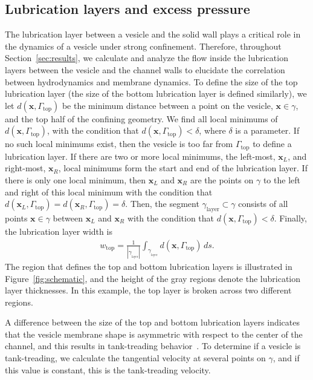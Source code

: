 \documentclass[twoside,twocolumn,9pt]{article}
\newcommand{\xx}{\mathbf{x}}
\begin{document}
\subsection{\label{sec:LL} Lubrication layers and excess pressure}
The lubrication layer between a vesicle and the solid wall plays a
critical role in the dynamics of a vesicle under strong confinement.
Therefore, throughout Section~\ref{sec:results}, we calculate and
analyze the flow inside the lubrication layers between the vesicle and
the channel walls to elucidate the correlation between hydrodynamics and
membrane dynamics. To define the size of the top lubrication layer (the
size of the bottom lubrication layer is defined similarly), we let
$d(\xx,\Gamma_\mathrm{top})$ be the minimum distance between a point on
the vesicle, $\xx \in \gamma$, and the top half of the confining
geometry. We find all local minimums of $d(\xx,\Gamma_\mathrm{top})$,
with the condition that $d(\xx,\Gamma_\mathrm{top}) < \delta$, where
$\delta$ is a parameter. If no such local minimums exist, then the
vesicle is too far from $\Gamma_\mathrm{top}$ to define a lubrication
layer. If there are two or more local minimums, the left-most, $\xx_L$,
and right-most, $\xx_R$, local minimums form the start and end of the
lubrication layer.  If there is only one local minimum, then $\xx_L$ and
$\xx_R$ are the points on $\gamma$ to the left and right of this local
minimum with the condition that $d(\xx_L,\Gamma_\mathrm{top}) =
d(\xx_R,\Gamma_\mathrm{top}) = \delta$. Then, the segment
$\gamma_{\mathrm{layer}} \subset \gamma$ consists of all points $\xx \in
\gamma$ between $\xx_L$ and $\xx_R$ with the condition that
$d(\xx,\Gamma_\mathrm{top}) < \delta$. Finally, the lubrication layer
width is
\begin{align}
  w_\mathrm{top} = \frac{1}{|\gamma_{_\mathrm{layer}}|} 
    \int_{\gamma_{_\mathrm{layer}}} d(\xx,\Gamma_\mathrm{top}) \, ds.
\end{align}
The region that defines the top and bottom lubrication layers is
illustrated in Figure~\ref{fig:schematic}, and the height of the gray
regions denote the lubrication layer thicknesses. In this example, the
top layer is broken across two different regions.

A difference between the size of the top and bottom lubrication layers
indicates that the vesicle membrane shape is asymmetric with respect to
the center of the channel, and this results in tank-treading
behavior~\cite{aga-bir2020}. To determine if a vesicle is tank-treading,
we calculate the tangential velocity at several points on $\gamma$, and
if this value is constant, this is the tank-treading velocity.
\end{document}
